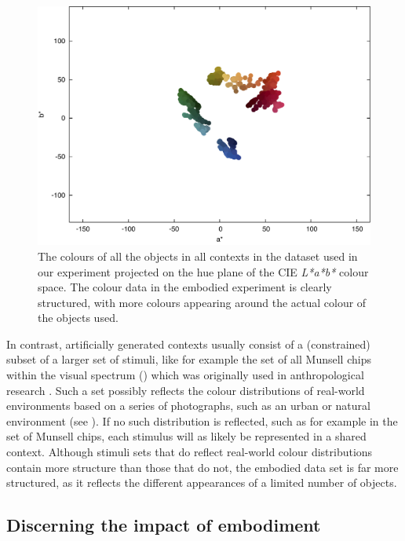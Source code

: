 \begin{figure}[htbp]
\begin{center}
\includegraphics[width=.8\textwidth]{./experiments/figures/grounding-grounded-world.pdf}
\caption[Structure of the grounded data set]{The colours of all the
  objects in all contexts in the dataset used in our experiment
  projected on the hue plane of the CIE \emph{L*a*b*} colour
  space. The colour data in the embodied experiment is clearly
  structured, with more colours appearing around the actual colour of
  the objects used.}
\label{fig:grounded-world}
\end{center}
\end{figure}

In contrast, artificially generated contexts usually consist of a
(constrained) subset of a larger set of stimuli, like for example the
set of all Munsell chips within the visual spectrum () which was originally used in anthropological research
\citep{kay10world, maclaury97color}. Such a set possibly reflects the
colour distributions of real-world environments based on a series of
photographs, such as an urban or natural environment (see ). If no such distribution is reflected,
such as for example in the set of Munsell chips, each stimulus will as
likely be represented in a shared context. Although stimuli sets that
do reflect real-world colour distributions contain more structure than
those that do not, the embodied data set is far more structured, as it
reflects the different appearances of a limited number of objects.

\subsection{Discerning the impact of embodiment}

